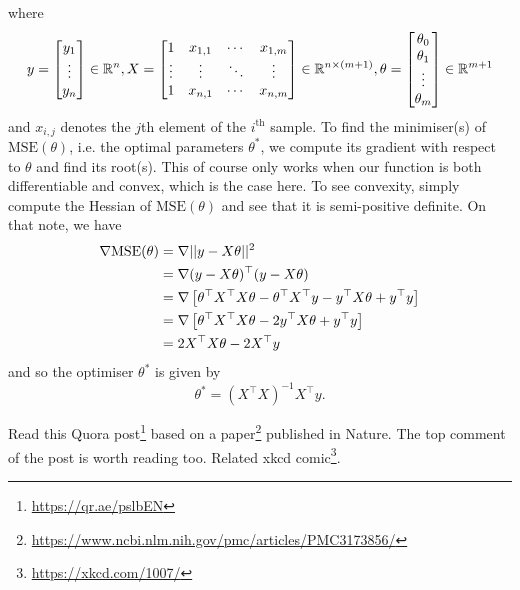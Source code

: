 \documentclass[11pt]{article}
\begin{document}
where
$$
y
=
\begin{bmatrix}
    y_1\\
    \vdots\\
    y_n
\end{bmatrix}
\in\mathbb{R}^n,
X
=
\begin{bmatrix}
    1 & x_{1,1} & \cdots & x_{1,m}\\
    \vdots & \vdots & \ddots & \vdots\\
    1 & x_{n,1} & \cdots & x_{n,m}
\end{bmatrix}
\in\mathbb{R}^{n\times (m+1)},
\theta
=
\begin{bmatrix}
    \theta_0\\
    \theta_1\\
    \vdots\\
    \theta_m
\end{bmatrix}
\in\mathbb{R}^{m+1}
$$
and $x_{i,j}$ denotes the $j$th element of the $i^{\text{th}}$ sample. To find the minimiser(s) of $\text{MSE}(\theta)$, i.e. the optimal parameters $\theta^{*}$, we compute its gradient with respect to $\theta$ and find its root(s). This of course only works when our function is both differentiable and convex, which is the case here. To see convexity, simply compute the Hessian of $\text{MSE}(\theta)$ and see that it is semi-positive definite. On that note, we have
\begin{align*}
    \nabla\text{MSE}(\theta)
    &=
    \nabla||y-X\theta||^2\\
    &=
    \nabla(y-X\theta)^{\top}(y-X\theta)\\
    &=
    \nabla\left[\theta^{\top}X^{\top}X\theta-\theta^{\top}X^{\top}y-y^{\top}X\theta+y^{\top}y\right]\\
    &=
    \nabla\left[\theta^{\top}X^{\top}X\theta-2y^{\top}X\theta+y^{\top}y\right]\\
    &=
    2X^{\top}X\theta-2X^{\top}y
\end{align*}
and so the optimiser $\theta^{*}$ is given by
$$
\theta^{*}=(X^{\top}X)^{-1}X^{\top}y.
$$

\begin{tcolorbox}[title={\textbf{Funny misuse of linear regression: Momentous sprint at the 2156 Olympics?}}, colback=myLightBlue, colbacktitle=myDarkBlue, colframe=myDarkBlue, coltitle=white]
    Read this Quora post\footnote{\url{https://qr.ae/pslbEN}} based on a paper\footnote{\url{https://www.ncbi.nlm.nih.gov/pmc/articles/PMC3173856/}} published in Nature. The top comment of the post is worth reading too. Related xkcd comic\footnote{\url{https://xkcd.com/1007/}}.
\end{tcolorbox}
\end{document}
